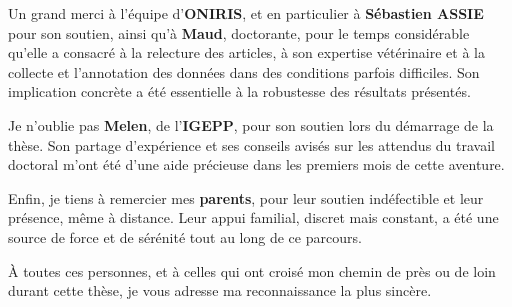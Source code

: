 Un grand merci à l’équipe d’\textbf{ONIRIS}, et en particulier à \textbf{Sébastien ASSIE} pour son soutien, ainsi qu’à \textbf{Maud}, doctorante, pour le temps considérable qu’elle a consacré à la relecture des articles, à son expertise vétérinaire et à la collecte et l’annotation des données dans des conditions parfois difficiles. Son implication concrète a été essentielle à la robustesse des résultats présentés. \vspace{0.5\baselineskip}

Je n’oublie pas \textbf{Melen}, de l’\textbf{IGEPP}, pour son soutien lors du démarrage de la thèse. Son partage d’expérience et ses conseils avisés sur les attendus du travail doctoral m’ont été d’une aide précieuse dans les premiers mois de cette aventure. \vspace{0.5\baselineskip}

Enfin, je tiens à remercier mes \textbf{parents}, pour leur soutien indéfectible et leur présence, même à distance. Leur appui familial, discret mais constant, a été une source de force et de sérénité tout au long de ce parcours. \vspace{0.5\baselineskip}

À toutes ces personnes, et à celles qui ont croisé mon chemin de près ou de loin durant cette thèse, je vous adresse ma reconnaissance la plus sincère.
